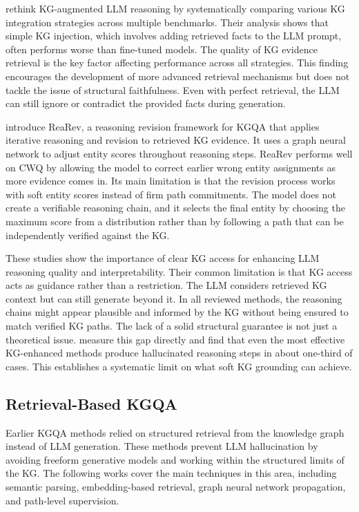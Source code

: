 \citet{he2022rethinkingKG} rethink KG-augmented LLM reasoning by systematically comparing various KG integration strategies across multiple benchmarks. Their analysis shows that simple KG injection, which involves adding retrieved facts to the LLM prompt, often performs worse than fine-tuned models. The quality of KG evidence retrieval is the key factor affecting performance across all strategies. This finding encourages the development of more advanced retrieval mechanisms but does not tackle the issue of structural faithfulness. Even with perfect retrieval, the LLM can still ignore or contradict the provided facts during generation.

\citet{mavromatis2022rearev} introduce ReaRev, a reasoning revision framework for KGQA that applies iterative reasoning and revision to retrieved KG evidence. It uses a graph neural network to adjust entity scores throughout reasoning steps. ReaRev performs well on CWQ by allowing the model to correct earlier wrong entity assignments as more evidence comes in. Its main limitation is that the revision process works with soft entity scores instead of firm path commitments. The model does not create a verifiable reasoning chain, and it selects the final entity by choosing the maximum score from a distribution rather than by following a path that can be independently verified against the KG.

These studies show the importance of clear KG access for enhancing LLM reasoning quality and interpretability. Their common limitation is that KG access acts as guidance rather than a restriction. The LLM considers retrieved KG context but can still generate beyond it. In all reviewed methods, the reasoning chains might appear plausible and informed by the KG without being ensured to match verified KG paths. The lack of a solid structural guarantee is not just a theoretical issue. \citet{luo2025-graph-constrained-reasoning} measure this gap directly and find that even the most effective KG-enhanced methods produce hallucinated reasoning steps in about one-third of cases. This establishes a systematic limit on what soft KG grounding can achieve.

\subsection{Retrieval-Based KGQA}

Earlier KGQA methods relied on structured retrieval from the knowledge graph instead of LLM generation. These methods prevent LLM hallucination by avoiding freeform generative models and working within the structured limits of the KG. The following works cover the main techniques in this area, including semantic parsing, embedding-based retrieval, graph neural network propagation, and path-level supervision.

